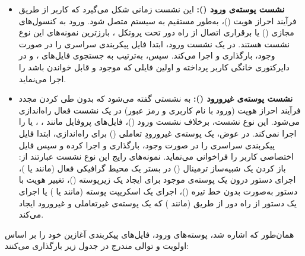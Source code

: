 \begin{itemize}
  \item \textbf{نشست پوسته‌ی ورود ():} این نشست زمانی شکل می‌گیرد که کاربر از طریق فرآیند احراز هویت ()، به‌طور مستقیم به سیستم متصل شود. ورود به کنسول‌های مجازی () یا برقراری اتصال از راه دور تحت پروتکل ، بارزترین نمونه‌های این نوع نشست هستند. در یک نشست ورود،  ابتدا فایل پیکربندی سراسری  را در صورت وجود، بارگذاری و اجرا می‌کند. سپس، به‌ترتیب به جستجوی فایل‌های ،  و  در دایرکتوری خانگی کاربر پرداخته و اولین فایلی که موجود و قابل خواندن باشد را اجرا می‌نماید.

  \item \textbf{نشست پوسته‌ی غیرورود ():} به نشستی گفته می‌شود که بدون طی کردن مجدد فرآیند احراز هویت (ورود با نام کاربری و رمز عبور) در یک نشست فعال راه‌اندازی می‌شود. این نوع نشست، برخلاف نشست ورود ()، فایل‌های پروفایل مانند ، ،  یا  را اجرا نمی‌کند. در عوض، یک پوسته‌ی غیرورودِ تعاملی () برای راه‌اندازی، ابتدا فایل پیکربندی سراسری  را در صورت وجود، بارگذاری و اجرا کرده و سپس فایل اختصاصی کاربر  را فراخوانی می‌نماید. نمونه‌های رایج این نوع نشست عبارتند از: باز کردن یک شبیه‌ساز ترمینال () در بستر یک محیط گرافیکی فعال (مانند  یا )، اجرای دستور  درون یک پوسته‌ی موجود برای ایجاد یک زیرپوسته ()، تغییر هویت با دستور  به‌صورت بدون خط تیره ()، اجرای یک اسکریپت پوسته (مانند  یا ) یا اجرای یک دستور از راه دور از طریق  (مانند ) که یک پوسته‌ی غیرتعاملی و غیرورود ایجاد می‌کند.
\end{itemize}

همان‌طور که اشاره شد، پوسته‌های ورود، فایل‌های پیکربندی آغازین خود را بر اساس اولویت و توالی مندرج در جدول زیر بارگذاری می‌کنند:

